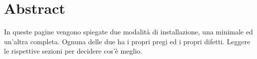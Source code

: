 
\section*{Abstract}

In queste pagine vengono spiegate due modalità di installazione, una minimale ed un'altra completa. Ognuna delle due ha i propri pregi ed i propri difetti. Leggere le rispettive sezioni per decidere cos'è meglio.

%
%
%
